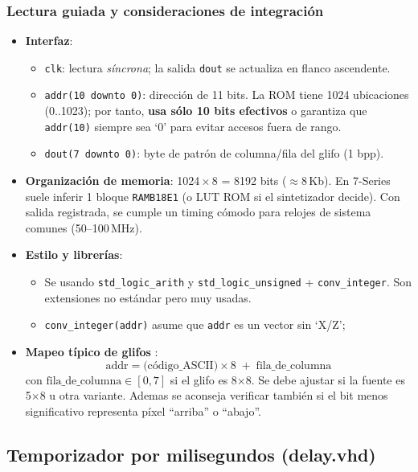 \documentclass[a4paper,12pt]{article}
\begin{document}
\subsubsection*{Lectura guiada y consideraciones de integración}
\begin{itemize}
  \item \textbf{Interfaz}:
  \begin{itemize}
    \item \texttt{clk}: lectura \emph{síncrona}; la salida \texttt{dout} se actualiza en flanco ascendente.
    \item \texttt{addr(10 downto 0)}: dirección de 11 bits. La ROM tiene 1024 ubicaciones (0..1023); por tanto, \textbf{usa sólo 10 bits efectivos} o garantiza que \texttt{addr(10)} siempre sea ‘0’ para evitar accesos fuera de rango.
    \item \texttt{dout(7 downto 0)}: byte de patrón de columna/fila del glifo (1 bpp).
  \end{itemize}

  \item \textbf{Organización de memoria}: 1024\,$\times$\,8 = 8192 bits (\(\approx\)8\,Kb). En 7-Series suele inferir 1 bloque \texttt{RAMB18E1} (o LUT ROM si el sintetizador decide). Con salida registrada, se cumple un timing cómodo para relojes de sistema comunes (50–100\,MHz).

  \item \textbf{Estilo y librerías}:
  \begin{itemize}
    \item Se usando \texttt{std\_logic\_arith} y \texttt{std\_logic\_unsigned} + \texttt{conv\_integer}. Son extensiones no estándar pero muy usadas. 
    \item \texttt{conv\_integer(addr)} asume que \texttt{addr} es un vector sin ‘X/Z’;
  \end{itemize}

  \item \textbf{Mapeo típico de glifos} :
  \[
    \text{addr} = \text{(código\_ASCII)} \times 8 \;+\; \text{fila\_de\_columna}
  \]
  con \(\text{fila\_de\_columna}\in[0,7]\) si el glifo es 8\(\times\)8. Se debe ajustar si la fuente es 5\(\times\)8 u otra variante. Ademas se aconseja verificar también si el bit menos significativo representa píxel “arriba” o “abajo”.
\end{itemize}

\subsection{Temporizador por milisegundos (delay.vhd)}
\label{sec:delay_ms}
\end{document}
